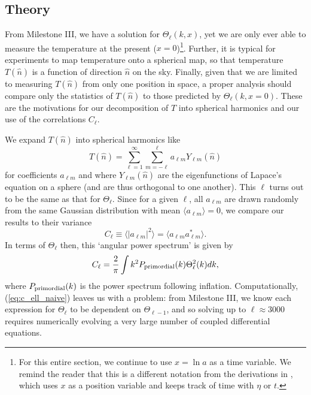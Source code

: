 \documentclass[aps,prl,twocolumn,groupedaddress,nofootinbib]{revtex4-2}
\begin{document}
\subsection{Theory}
From Milestone III, we have a solution for $\Theta_\ell(k, x)$, yet we are only ever able to measure the temperature at the present ($x=0$)\footnote{For this entire section, we continue to use $x=\ln a$ as a time variable. We remind the reader that this is a different notation from the derivations in \cite{Dodelson_Schmidt_2026}, which uses $x$ as a position variable and keeps track of time with $\eta$ or $t$.}. Further, it is typical for experiments to map temperature onto a spherical map, so that temperature $T(\hat n)$ is a function of direction $\hat n$ on the sky. Finally, given that we are limited to measuring $T(\hat n)$ from only one position in space, a proper analysis should compare only the statistics of $T(\hat n)$ to those predicted by $\Theta_\ell(k, x=0)$. These are the motivations for our decomposition of $T$ into spherical harmonics and our use of the correlations $C_\ell$.

We expand $T(\hat n)$ into spherical harmonics like
\begin{equation}
    T(\hat{n}) = \sum_{\ell=1}^\infty \sum_{m=-\ell}^\ell a_{\ell m} Y_{\ell m}(\hat{n})
\end{equation}
for coefficients $a_{\ell m}$ and where $Y_{\ell m}(\hat{n})$ are the eigenfunctions of Lapace's equation on a sphere (and are thus orthogonal to one another). This $\ell$ turns out to be the same as that for $\Theta_\ell$. Since for a given $\ell$, all $a_{\ell m}$ are drawn randomly from the same Gaussian distribution with mean $\langle a_{\ell m} \rangle = 0$, we compare our results to their variance
\begin{equation}
    C_\ell \equiv \langle |a_{\ell m}|^2 \rangle = \langle a_{\ell m}a_{\ell m}^* \rangle.
\end{equation}
In terms of $\Theta_\ell$ then, this `angular power spectrum' is given by
\begin{equation}
    C_\ell = \frac{2}{\pi}\int k^2P_{\rm primordial}(k) \Theta_\ell^2(k)dk,
    \label{eq:c_ell_naive}
\end{equation}
where $P_{\rm primordial}(k)$ is the power spectrum following inflation. Computationally, (\ref{eq:c_ell_naive}) leaves us with a problem: from Milestone III, we know each expression for $\Theta_\ell$ to be dependent on $\Theta_{\ell - 1}$, and so solving up to $\ell\approx3000$ requires numerically evolving a very large number of coupled differential equations.
\end{document}
